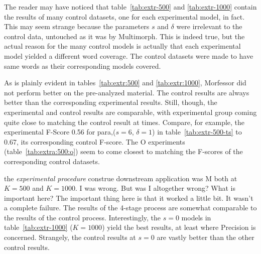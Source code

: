 \begin{enumerate}
{{	The reader may have noticed that table~\ref{tab:extr-500} and \ref{tab:extr-1000} contain the results of many control datasets, one for each experimental model, in fact. This may seem strange because the parameters $s$ and $\delta$ were irrelevant to the control data, untouched as it was by Multimorph. This is indeed true, but the actual reason for the many control models is actually that each experimental model yielded a different word coverage. The control datasets were made to have same words as their corresponding models covered. 

	As is plainly evident in tables~\ref{tab:extr:500} and \ref{tab:extr:1000}, Morfessor did not perform better on the pre-analyzed material. The control results are always better than the corresponding experimental results. Still, though, the experimental and control results are comparable, with experimental group coming quite close to matching the control result at times. Compare, for example, the experimental F-Score 0.56 for para,($s=6$, $\delta=1$) in table~\ref{tab:extr-500-ts} to 0.67, its corresponding control F-score. The O experiments (table~\ref{tab:extra:500:o}) seem to come closest to matching the F-scores of the corresponding control datasets.


the \emph{experimental procedure} construe downstream application was M both at $K=500$ and $K=1000$. I was wrong. But was I altogether wrong? What is important here? The important thing here is that it worked a little bit. It wasn't a complete failure. The results of the 4-stage process are somewhat comparable to the results of the control process. 
Interestingly, the $s=0$ models in table~\ref{tab:extr-1000} ($K=1000$) yield the best results, at least where Precision is concerned. Strangely, the  control results at $s=0$ are vastly better than the other control results.  

}}
\end{enumerate}
